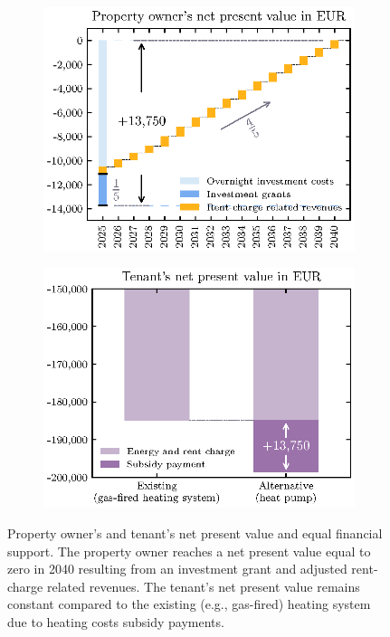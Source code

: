 \begin{figure}[h]
	\begin{subfigure}[c]{0.5\textwidth}
		\centering
		\includegraphics[width=1\linewidth]{figures/3_Methodology/Validate-Landlord.eps}
		\label{fig:landlord}
	\end{subfigure}
	\begin{subfigure}[c]{0.5\textwidth}
		\centering
		\includegraphics[width=1\linewidth]{figures/3_Methodology/Validate-Tenant.eps}
		\label{fig:tenant}
	\end{subfigure}
	\caption{Property owner's and tenant's net present value and equal financial support. The property owner reaches a net present value equal to zero in 2040 resulting from an investment grant and adjusted rent-charge related revenues. The tenant's net present value remains constant compared to the existing (e.g., gas-fired) heating system due to heating costs subsidy payments.}
	\label{val:npv}
\end{figure}


